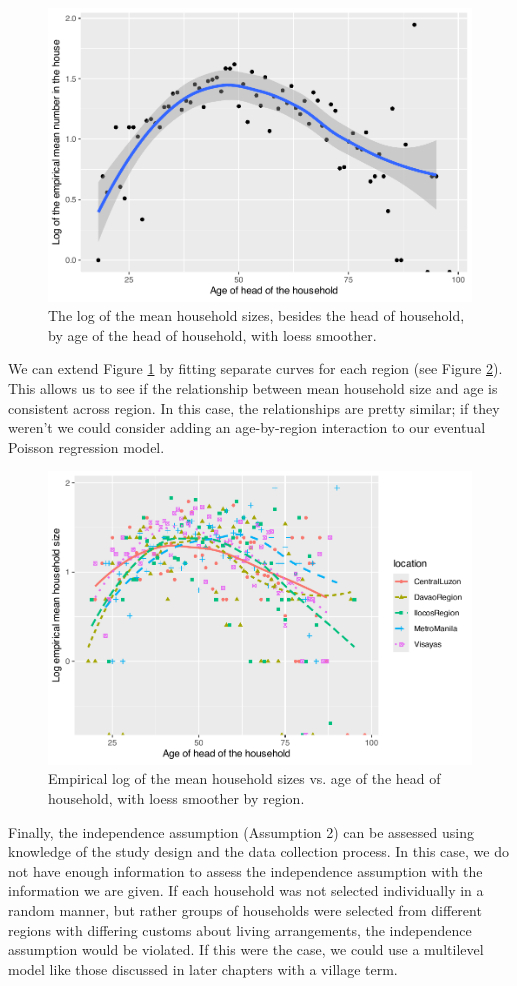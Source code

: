 \documentclass[
]{krantz}
\begin{document}
\begin{figure}

{\centering \includegraphics[width=0.6\linewidth]{bookdown-BeyondMLR_files/figure-latex/ageXnhouse-1} 

}

\caption{The log of the mean household sizes, besides the head of household, by age of the head of household, with loess smoother.}\label{fig:ageXnhouse}
\end{figure}

We can extend Figure \ref{fig:ageXnhouse} by fitting separate curves for each region (see Figure \ref{fig:byregion}). This allows us to see if the relationship between mean household size and age is consistent across region. In this case, the relationships are pretty similar; if they weren't we could consider adding an age-by-region interaction to our eventual Poisson regression model.

\begin{figure}

{\centering \includegraphics[width=0.6\linewidth]{bookdown-BeyondMLR_files/figure-latex/byregion-1} 

}

\caption{Empirical log of the mean household sizes vs. age of the head of household, with loess smoother by region.}\label{fig:byregion}
\end{figure}

Finally, the independence assumption (Assumption 2) can be assessed using knowledge of the study design and the data collection process. In this case, we do not have enough information to assess the independence assumption with the information we are given. If each household was not selected individually in a random manner, but rather groups of households were selected from different regions with differing customs about living arrangements, the independence assumption would be violated. If this were the case, we could use a multilevel model like those discussed in later chapters with a village term.
\end{document}
